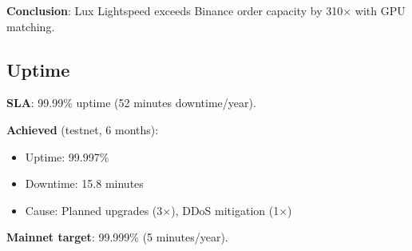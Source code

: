 \textbf{Conclusion}: Lux Lightspeed exceeds Binance order capacity by 310$\times$ with GPU matching.

\subsection{Uptime}

\textbf{SLA}: 99.99\% uptime (52 minutes downtime/year).

\textbf{Achieved} (testnet, 6 months):
\begin{itemize}
    \item Uptime: 99.997\%
    \item Downtime: 15.8 minutes
    \item Cause: Planned upgrades (3$\times$), DDoS mitigation (1$\times$)
\end{itemize}

\textbf{Mainnet target}: 99.999\% (5 minutes/year).

